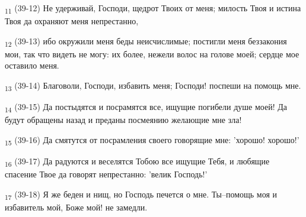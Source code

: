 \begin{tcolorbox}
\textsubscript{11} (39-12) Не удерживай, Господи, щедрот Твоих от меня; милость Твоя и истина Твоя да охраняют меня непрестанно,
\end{tcolorbox}
\begin{tcolorbox}
\textsubscript{12} (39-13) ибо окружили меня беды неисчислимые; постигли меня беззакония мои, так что видеть не могу: их более, нежели волос на голове моей; сердце мое оставило меня.
\end{tcolorbox}
\begin{tcolorbox}
\textsubscript{13} (39-14) Благоволи, Господи, избавить меня; Господи! поспеши на помощь мне.
\end{tcolorbox}
\begin{tcolorbox}
\textsubscript{14} (39-15) Да постыдятся и посрамятся все, ищущие погибели душе моей! Да будут обращены назад и преданы посмеянию желающие мне зла!
\end{tcolorbox}
\begin{tcolorbox}
\textsubscript{15} (39-16) Да смятутся от посрамления своего говорящие мне: 'хорошо! хорошо!'
\end{tcolorbox}
\begin{tcolorbox}
\textsubscript{16} (39-17) Да радуются и веселятся Тобою все ищущие Тебя, и любящие спасение Твое да говорят непрестанно: 'велик Господь!'
\end{tcolorbox}
\begin{tcolorbox}
\textsubscript{17} (39-18) Я же беден и нищ, но Господь печется о мне. Ты--помощь моя и избавитель мой, Боже мой! не замедли.
\end{tcolorbox}
